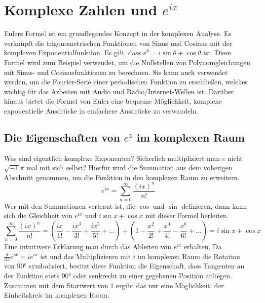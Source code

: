 \section{Komplexe Zahlen und $e^{ix}$}
Eulers Formel ist ein grundlegendes Konzept in der komplexen Analyse. Es verknüpft die trigonometrischen Funktionen von Sinus und Cosinus mit der komplexen Exponentialfunktion. Es gilt, dass $e^\theta = i\sin\theta + \cos\theta$ ist.
Diese Formel wird zum Beispiel verwendet, um die Nullstellen von Polynomgleichungen mit Sinus- und Cosinusfunktionen zu berechnen. Sie kann auch verwendet werden, um die Fourier-Serie einer periodischen Funktion zu erschließen, welches wichtig für das Arbeiten mit Audio und Radio/Internet-Wellen ist. Darüber hinaus bietet die Formel von Euler eine bequeme Möglichkeit, komplexe exponentielle Ausdrücke in einfachere Ausdrücke zu verwandeln.
\subsection{Die Eigenschaften von $e^z$ im komplexen Raum}
Was sind eigentlich komplexe Exponenten? Sicherlich multipliziert man $e$ nicht $\sqrt{-1}\pi$ mal mit sich selbst? Hierfür wird die Summation aus dem voherigen Abschnitt genommen, um die Funktion in den komplexen Raum zu erweitern. \[
  e^{ix} = \sum_{n=0}^\infty \frac{(ix)^n}{n!}
  \] Wer mit den Summationen vertraut ist, die $\cos$ und  $\sin$ definieren, dann kann sich die Gleichheit von $e^{ix}$ und  $i\sin{x}+ \cos{x}$ mit dieser Formel herleiten.  \[
\sum_{n=0}^\infty \frac{(ix)^n}{n!} = (\frac{ix}{1!} - \frac{ix^3}{3!} + \frac{ix^5}{5!} + \dots) + (1 - \frac{x^2}{2!} + \frac{x^4}{4!} - \frac{x^6}{6!} + \dots) = i\sin{x} + \cos{x}
\] Eine intuitivere Erklärung man durch das Ableiten von $e^{ix}$ erhalten. Da  $\frac{d}{dx}e^{ix} = ie^{ix}$ ist und das Multiplizieren mit $i$ im komplexen Raum die Rotation von 90° symbolisiert, besitzt diese Funktion die Eigenschaft, dass Tangenten an der Funktion stets 90° oder senkrecht 
zu einer gegebenen Position anliegen. Zusammen mit dem Startwert von 1 ergibt das nur eine Möglichkeit: der Einheitskreis im komplexen Raum.
